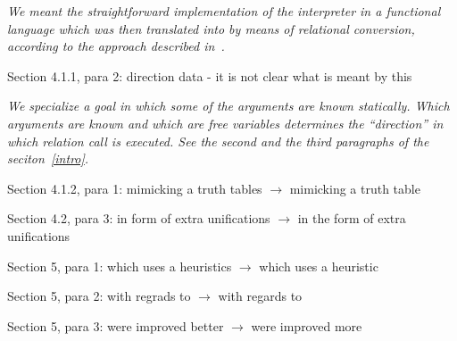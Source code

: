 \emph{We meant the straightforward implementation of the interpreter in a functional language which was then translated into \mk by means of relational conversion, according to the approach described in~\cite{lozov2019relational}.}

Section 4.1.1, para 2: direction data - it is not clear what is meant by this

\emph{We specialize a \mk goal in which some of the arguments are known statically. Which arguments are known and which are free variables determines the ``direction'' in which relation call is executed. See the second and the third paragraphs of the seciton~\ref{intro}. }

Section 4.1.2, para 1: mimicking a truth tables $\to$ mimicking a truth table

Section 4.2, para 3: in form of extra unifications $\to$ in the form of extra unifications

Section 5, para 1: which uses a heuristics $\to$ which uses a heuristic

Section 5, para 2: with regrads to $\to$ with regards to

Section 5, para 3: were improved better $\to$ were improved more


